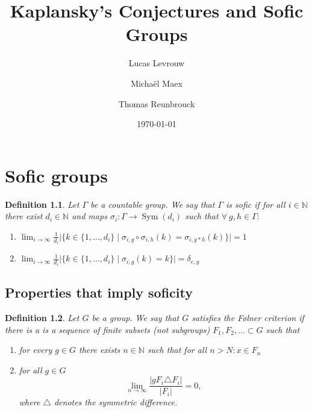 \documentclass[a4paper]{memoir}
\author{Lucas Levrouw \and Michaël Maex \and Thomas Reunbrouck}
\title{Kaplansky's Conjectures and Sofic Groups}
\date{\today}
\newcommand{\N}{\mathbb{N}}
\newtheorem{definition}{Definition}
\DeclareMathOperator{\sym}{Sym}
\begin{document}
    \maketitle
    \chapter{Sofic groups}
    \begin{definition}
        Let $\Gamma$ be a countable group. We say that $\Gamma$ is sofic if for all $i\in \N$ there exist $d_i \in \N$ and maps $\sigma_i : \Gamma \to \sym(d_i)$ such that $\forall\ g, h \in \Gamma:$
        \begin{enumerate}
            \item $\displaystyle \lim_{i\to \infty} \frac{1}{d_i} \big|\big\{k \in \{1, \dots, d_i\} \mid \sigma_{i,g} \circ \sigma_{i,h}(k) = \sigma_{i, g*h} (k) \big\}\big| = 1$
            \item $\displaystyle \lim_{i\to \infty} \frac{1}{d_i}  \big|\big\{k \in \{1, \dots, d_i\} \mid \sigma_{i,g}(k) = k \big\}\big| = \delta_{e,g}$
        \end{enumerate}
    \end{definition}

    \section{Properties that imply soficity}
    \begin{definition}\cite{noauthor_folner_2019}
        Let $G$ be a group. We say that $G$ satisfies the Følner criterion if there is a is a sequence of finite subsets (not subgroups) $F_1, F_2, \dots \subset G$ such that 
        \begin{enumerate}
            \item for every $g \in G$ there exists $n \in \N$ such that for all $n > N: x \in F_n$
            \item for all $g \in G$ 
            $$\lim_{n\to \infty} \frac{\left| gF_i \triangle F_i \right|}{\left| F_i \right|} = 0, $$
            where $\triangle$ denotes the symmetric difference.
        \end{enumerate}
    \end{definition}
\end{document}
